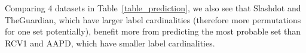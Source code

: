 Comparing 4 datasets in Table~\ref{table_prediction}, we also see that Slashdot and TheGuardian, which have larger label cardinalities (therefore more permutations for one set potentially), benefit more from predicting the most probable set than RCV1 and AAPD, which have smaller label cardinalities.









